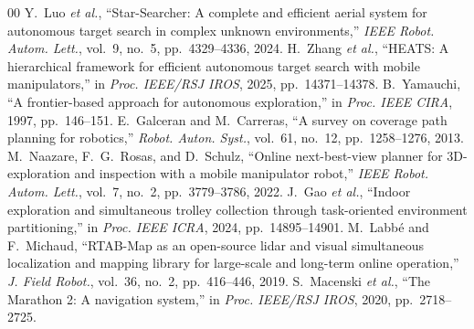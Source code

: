 \documentclass[conference,a4paper,10pt]{IEEEtran}
\begin{document}
\begin{thebibliography}{00}
 Y.~Luo \emph{et al.}, ``Star-Searcher: A complete and
efficient aerial system for autonomous target search in complex unknown
environments,'' \emph{IEEE Robot. Autom. Lett.}, vol.~9, no.~5,
pp.~4329--4336, 2024.
 H.~Zhang \emph{et al.}, ``HEATS: A hierarchical framework for
efficient autonomous target search with mobile manipulators,'' in \emph{Proc.
IEEE/RSJ IROS}, 2025, pp.~14371--14378.
 B.~Yamauchi, ``A frontier-based approach for autonomous
exploration,'' in \emph{Proc. IEEE CIRA}, 1997, pp.~146--151.
 E.~Galceran and M.~Carreras, ``A survey on coverage path
planning for robotics,'' \emph{Robot. Auton. Syst.}, vol.~61, no.~12,
pp.~1258--1276, 2013.
 M.~Naazare, F.~G.~Rosas, and D.~Schulz, ``Online
next-best-view planner for 3D-exploration and inspection with a mobile
manipulator robot,'' \emph{IEEE Robot. Autom. Lett.}, vol.~7, no.~2,
pp.~3779--3786, 2022.
 J.~Gao \emph{et al.}, ``Indoor exploration and simultaneous
trolley collection through task-oriented environment partitioning,'' in
\emph{Proc. IEEE ICRA}, 2024, pp.~14895--14901.
 M.~Labb\'{e} and F.~Michaud, ``RTAB-Map as an open-source
lidar and visual simultaneous localization and mapping library for large-scale
and long-term online operation,'' \emph{J. Field Robot.}, vol.~36, no.~2,
pp.~416--446, 2019.
 S.~Macenski \emph{et al.}, ``The Marathon 2: A navigation
system,'' in \emph{Proc. IEEE/RSJ IROS}, 2020, pp.~2718--2725.
\end{thebibliography}
\end{document}
